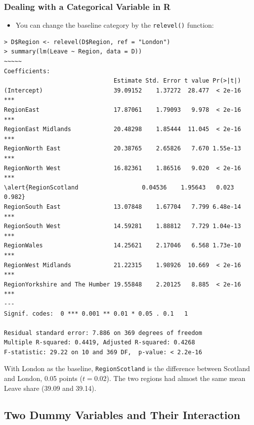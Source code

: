 \documentclass[xcolor=svgnames,9pt,english,aspectratio=169,t]{beamer}
\begin{document}
\begin{frame}[fragile]
\frametitle{Dealing with a Categorical Variable in R}
\small
{}
\begin{itemize}
  \item You can change the baseline category by the {\tt relevel()} function:
\end{itemize}
\medskip

\begin{Verbatim}[fontsize=\scriptsize, frame=single, label=R Code, commandchars=\\\{\}]
> D$Region <- relevel(D$Region, ref = "London")
> summary(lm(Leave ~ Region, data = D))
~~~~~
Coefficients:
                               Estimate Std. Error t value Pr(>|t|)
(Intercept)                    39.09152    1.37272  28.477  < 2e-16 ***
RegionEast                     17.87061    1.79093   9.978  < 2e-16 ***
RegionEast Midlands            20.48298    1.85444  11.045  < 2e-16 ***
RegionNorth East               20.38765    2.65826   7.670 1.55e-13 ***
RegionNorth West               16.82361    1.86516   9.020  < 2e-16 ***
\alert{RegionScotland                  0.04536    1.95643   0.023    0.982}
RegionSouth East               13.07848    1.67704   7.799 6.48e-14 ***
RegionSouth West               14.59281    1.88812   7.729 1.04e-13 ***
RegionWales                    14.25621    2.17046   6.568 1.73e-10 ***
RegionWest Midlands            21.22315    1.98926  10.669  < 2e-16 ***
RegionYorkshire and The Humber 19.55848    2.20125   8.885  < 2e-16 ***
---
Signif. codes:  0 *** 0.001 ** 0.01 * 0.05 . 0.1   1

Residual standard error: 7.886 on 369 degrees of freedom
Multiple R-squared: 0.4419,	Adjusted R-squared: 0.4268
F-statistic: 29.22 on 10 and 369 DF,  p-value: < 2.2e-16
\end{Verbatim}
\smallskip
With London as the baseline, \texttt{RegionScotland} is the difference between Scotland and London, 0.05 points ($t=0.02$). The two regions had almost the same mean Leave share (39.09 and 39.14).
\end{frame}



\subsection{Two Dummy Variables and Their Interaction}
\end{document}
